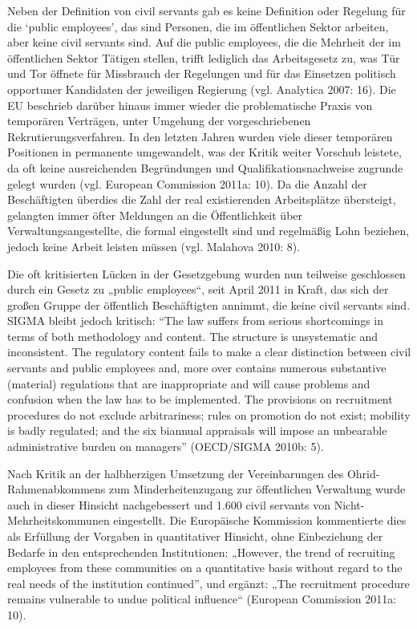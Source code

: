 Neben der Definition von civil servants gab es keine Definition oder Regelung für die ‘public employees’, das sind Personen, die im öffentlichen Sektor arbeiten, aber keine civil servants sind. Auf die public employees, die die Mehrheit der im öffentlichen Sektor Tätigen stellen, trifft lediglich das Arbeitsgesetz zu, was Tür und Tor öffnete für Missbrauch der Regelungen und für das Einsetzen politisch opportuner Kandidaten der jeweiligen Regierung (vgl. Analytica 2007: 16). Die EU beschrieb darüber hinaus immer wieder die problematische Praxis von temporären Verträgen, unter Umgehung der vorgeschriebenen Rekrutierungsverfahren. In den letzten Jahren wurden viele dieser temporären Positionen in permanente umgewandelt, was der Kritik weiter Vorschub leistete, da oft keine ausreichenden Begründungen und Qualifikationsnachweise zugrunde gelegt wurden (vgl. European Commission 2011a: 10). Da die Anzahl der Beschäftigten überdies die Zahl der real existierenden Arbeitsplätze übersteigt, gelangten immer öfter Meldungen an die Öffentlichkeit über Verwaltungsangestellte, die formal eingestellt sind und regelmäßig Lohn beziehen, jedoch keine Arbeit leisten müssen (vgl. Malahova 2010: 8).\par
Die oft kritisierten Lücken in der Gesetzgebung wurden nun teilweise geschlossen durch ein Gesetz zu „public employees“, seit April 2011 in Kraft, das sich der großen Gruppe der öffentlich Beschäftigten annimmt, die keine civil servants sind. SIGMA bleibt jedoch kritisch: “The law suffers from serious shortcomings in terms of both methodology and content. The structure is unsystematic and inconsistent. The regulatory content fails to make a clear distinction between civil servants and public employees and, more over contains numerous substantive (material) regulations that are inappropriate and will cause problems and confusion when the law has to be implemented. The provisions on recruitment procedures do not exclude arbitrariness; rules on promotion do not exist; mobility is badly regulated; and the six biannual appraisals will impose an unbearable administrative burden on managers” (OECD/SIGMA 2010b: 5).\par
Nach Kritik an der halbherzigen Umsetzung der Vereinbarungen des Ohrid-Rahmenabkommens zum Minderheitenzugang zur öffentlichen Verwaltung wurde auch in dieser Hinsicht nachgebessert und 1.600 civil servants von Nicht-Mehrheitskommunen eingestellt. Die Europäische Kommission kommentierte dies als Erfüllung der Vorgaben in quantitativer Hinsicht, ohne Einbeziehung der Bedarfe in den entsprechenden Institutionen: „However, the trend of recruiting employees from these communities on a quantitative basis without regard to the real needs of the institution continued”, und ergänzt: „The recruitment procedure remains vulnerable to undue political influence“ (European Commission 2011a: 10).\par
